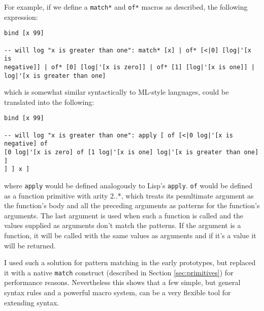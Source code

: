 For example, if we define a \texttt{match*} and \texttt{of*} macros as
described, the following expression:
\begin{lstlisting}
bind [x 99]

-- will log "x is greater than one": match* [x] | of* [<|0] [log|'[x is
negative]] | of* [0] [log|'[x is zero]] | of* [1] [log|'[x is one]] |
log|'[x is greater than one]
\end{lstlisting}

which is somewhat similar syntactically to
ML-style\cite[Section~Algebraic datatypes and pattern matching]{standard_ml_wikipedia}
languages, could be translated into the following:
\begin{lstlisting}
bind [x 99]

-- will log "x is greater than one": apply [ of [<|0 log|'[x is negative] of
[0 log|'[x is zero] of [1 log|'[x is one] log|'[x is greater than one] ]
] ] x ]
\end{lstlisting}

where \texttt{apply} would be defined analogously to Lisp's
\texttt{apply}. \texttt{of} would be defined as a function primitive with arity
2..*, which treats its penultimate argument as the function's body and all the
preceding arguments as patterns for the function's arguments. The last argument
is used when such a function is called and the values supplied as arguments
don't match the patterns. If the argument is a function, it will be called with
the same values as arguments and if it's a value it will be returned.

I used such a solution for pattern matching in the early prototypes, but
replaced it with a native \texttt{match} construct (described in Section
\ref{sec:primitives}) for performance reasons. Nevertheless this shows that a
few simple, but general syntax rules and a powerful macro system, can be a very
flexible tool for extending syntax.
